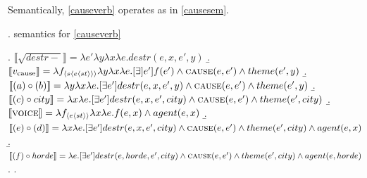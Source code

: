 \documentclass[12pt]{article}
\newcommand*{\textsub}[1]{\ensuremath{_\textrm{{\scriptsize #1}}}}
\begin{document}
Semantically, \ref{causeverb} operates as in \ref{causesem}.

\singlespacing

\ex. \label{causesem} semantics for \ref{causeverb}

\a. \begin{math}\llbracket\sqrt{destr-}\rrbracket = \lambda e' \lambda y \lambda x \lambda e . destr(e,x,e',y)\end{math}
\b. \begin{math}\llbracket v\textsub{cause}\rrbracket = \lambda f_{\langle s\langle e \langle st \rangle \rangle \rangle} \lambda y \lambda x \lambda e . [\exists] e']f(e') \land \textsc{cause}(e,e') \land theme(e',y)\end{math}
\b. \begin{math}\llbracket (a) \circ (b) \rrbracket = \lambda y \lambda x \lambda e . [\exists e'] destr(e,x,e',y) \land \textsc{cause}(e,e') \land theme(e',y) \end{math}
\b. \begin{math}\llbracket (c) \circ city\rrbracket = \lambda x \lambda e . [\exists e'] destr(e,x,e',city) \land \textsc{cause}(e,e') \land theme(e',city) \end{math}
\b. \begin{math}\llbracket \textsc{voice}\rrbracket = \lambda f_{\langle e \langle st \rangle \rangle } \lambda x \lambda e . f(e,x) \land agent(e,x) \end{math}
\b. \begin{math}\llbracket (e) \circ (d) \rrbracket = \lambda x \lambda e . [\exists e'] destr(e,x,e',city) \land \textsc{cause}(e,e') \land theme(e',city) \land agent(e,x) \end{math}
\b. \begin{math}\llbracket (f) \circ horde \rrbracket = \lambda e . [\exists e'] destr(e,horde,e',city) \land \textsc{cause}(e,e') \land theme(e',city) \land agent(e,horde) \end{math}
\z. \z. \par

\doublespacing
\end{document}
